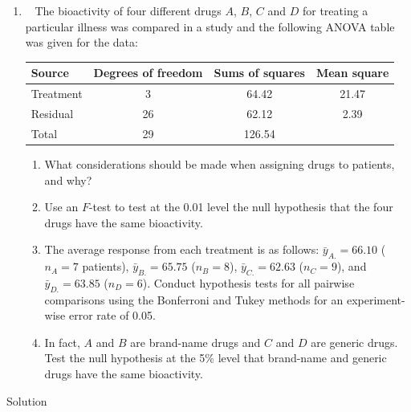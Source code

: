 \documentclass[
]{book}
\theoremstyle{definition}
\theoremstyle{definition}
\theoremstyle{definition}
\theoremstyle{definition}
\theoremstyle{remark}
\begin{document}
\begin{enumerate}
\def\labelenumi{\arabic{enumi}.}
\setcounter{enumi}{1}
\item
  ~\citep[Adapted from][]{WH2009} The bioactivity of four different drugs \(A\), \(B\), \(C\) and \(D\) for treating a particular illness was compared in a study and the following ANOVA table was given for the data:

  \begin{longtable}[]{@{}lccc@{}}
  \toprule
  Source & Degrees of freedom & Sums of squares & Mean square \\
  \midrule
  \endhead
  Treatment & 3 & 64.42 & 21.47 \\
  Residual & 26 & 62.12 & 2.39 \\
  Total & 29 & 126.54 & \\
  \bottomrule
  \end{longtable}

  \begin{enumerate}
  \def\labelenumii{\roman{enumii}.}
  \item
    What considerations should be made when assigning drugs to patients, and why?
  \item
    Use an \(F\)-test to test at the 0.01 level the null hypothesis that the four drugs have the same bioactivity.
  \item
    The average response from each treatment is as follows: \(\bar{y}_{A.}=66.10\) (\(n_A=7\) patients), \(\bar{y}_{B.}=65.75\) (\(n_B=8\)), \(\bar{y}_{C.} = 62.63\) (\(n_C=9\)), and \(\bar{y}_{D.}=63.85\) (\(n_D=6\)). Conduct hypothesis tests for all pairwise comparisons using the Bonferroni and Tukey methods for an experiment-wise error rate of 0.05.
  \item
    In fact, \(A\) and \(B\) are brand-name drugs and \(C\) and \(D\) are generic drugs. Test the null hypothesis at the 5\% level that brand-name and generic drugs have the same bioactivity.
  \end{enumerate}
\end{enumerate}

Solution
\end{document}
